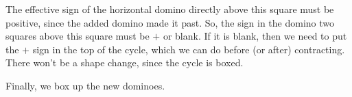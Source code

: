 \documentclass[12pt]{article}
\numberwithin{equation}{section}
\newcommand{\verticalDominoMaybe}[3]{\filldraw [dominoMaybeStyle] (#2 - 1 + \eps,  #1 - 1 + \eps) rectangle + (1 - \teps,2 -\teps) node [dominoText] {$#3$};}
\newcommand{\horizontalDominoMaybeShift}[4]{\filldraw [dominoMaybeStyle] (#2 - 1 + #4 + \eps, #1 - 1 + \eps) rectangle + (2 - \teps, 1 -\teps) node [dominoText] {$#3$};}
\begin{document}
\begin{itemize}
\begin{itemize}
\begin{itemize}
\begin{figure}[H]
        \end{figure}
        The effective sign of the horizontal domino directly above this square must be positive, since the added domino made it past.
        So, the sign in the domino two squares above this square must be $+$ or blank.
        If it is blank, then we need to put the $+$ sign in the top of the cycle, which we can do before  (or after) contracting.
        There won't be a shape change, since the cycle is boxed.
        \begin{figure}[H]
          \centering
        \end{figure}
        Finally, we box up the new dominoes.


\end{itemize}
\end{itemize}
\end{itemize}
\end{document}
